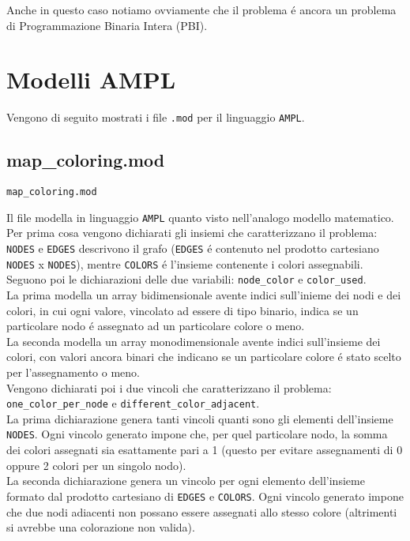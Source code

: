 \documentclass{article}
\begin{document}
Anche in questo caso notiamo ovviamente che il problema \'e ancora un problema di Programmazione Binaria Intera (PBI).\\

\pagebreak

\section{Modelli AMPL}
Vengono di seguito mostrati i file \texttt{.mod} per il linguaggio \texttt{AMPL}.\\

\subsection{map\_coloring.mod}
\texttt{map\_coloring.mod}


\vspace{5mm}

Il file modella in linguaggio \texttt{AMPL} quanto visto nell'analogo modello matematico.\\
Per prima cosa vengono dichiarati gli insiemi che caratterizzano il problema: \texttt{NODES} e \texttt{EDGES} descrivono il grafo (\texttt{EDGES} \'e contenuto nel prodotto cartesiano \texttt{NODES} x \texttt{NODES}), mentre \texttt{COLORS} \'e l'insieme contenente i colori assegnabili.\\

Seguono poi le dichiarazioni delle due variabili: \texttt{node\_color} e \texttt{color\_used}.\\
La prima modella un array bidimensionale avente indici sull'inieme dei nodi e dei colori, in cui ogni valore, vincolato ad essere di tipo binario, indica se un particolare nodo \'e assegnato ad un particolare colore o meno.\\
La seconda modella un array monodimensionale avente indici sull'insieme dei colori, con valori ancora binari che indicano se un particolare colore \'e stato scelto per l'assegnamento o meno.\\ 

Vengono dichiarati poi i due vincoli che caratterizzano il problema: \texttt{one\_color\_per\_node} e \texttt{different\_color\_adjacent}.\\
La prima dichiarazione genera tanti vincoli quanti sono gli elementi dell'insieme \texttt{NODES}. Ogni vincolo generato impone che, per quel particolare nodo, la somma dei colori assegnati sia esattamente pari a 1 (questo per evitare assegnamenti di 0 oppure 2 colori per un singolo nodo).\\
La seconda dichiarazione genera un vincolo per ogni elemento dell'insieme formato dal prodotto cartesiano di \texttt{EDGES} e \texttt{COLORS}. Ogni vincolo generato impone che due nodi adiacenti non possano essere assegnati allo stesso colore (altrimenti si avrebbe una colorazione non valida).\\
\end{document}
